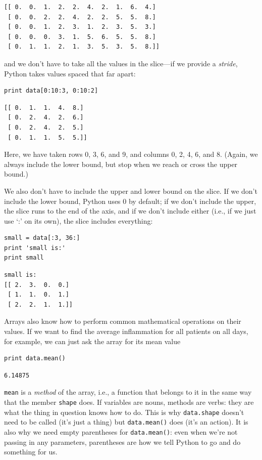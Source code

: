 \documentclass[]{book}
\newcommand{\gdef}[2]{\emph{#2}}
\begin{document}
\begin{verbatim}
[[ 0.  0.  1.  2.  2.  4.  2.  1.  6.  4.]
 [ 0.  0.  2.  2.  4.  2.  2.  5.  5.  8.]
 [ 0.  0.  1.  2.  3.  1.  2.  3.  5.  3.]
 [ 0.  0.  0.  3.  1.  5.  6.  5.  5.  8.]
 [ 0.  1.  1.  2.  1.  3.  5.  3.  5.  8.]]
\end{verbatim}

and we don't have to take all the values in the slice---if we provide a
\gdef{g:stride}{stride}, Python takes values spaced that far apart:

\begin{verbatim}
print data[0:10:3, 0:10:2]
\end{verbatim}

\begin{verbatim}
[[ 0.  1.  1.  4.  8.]
 [ 0.  2.  4.  2.  6.]
 [ 0.  2.  4.  2.  5.]
 [ 0.  1.  1.  5.  5.]]
\end{verbatim}

Here, we have taken rows 0, 3, 6, and 9, and columns 0, 2, 4, 6, and 8.
(Again, we always include the lower bound, but stop when we reach or
cross the upper bound.)

We also don't have to include the upper and lower bound on the slice. If
we don't include the lower bound, Python uses 0 by default; if we don't
include the upper, the slice runs to the end of the axis, and if we
don't include either (i.e., if we just use `:' on its own), the slice
includes everything:

\begin{verbatim}
small = data[:3, 36:]
print 'small is:'
print small
\end{verbatim}

\begin{verbatim}
small is:
[[ 2.  3.  0.  0.]
 [ 1.  1.  0.  1.]
 [ 2.  2.  1.  1.]]
\end{verbatim}

Arrays also know how to perform common mathematical operations on their
values. If we want to find the average inflammation for all patients on
all days, for example, we can just ask the array for its mean value

\begin{verbatim}
print data.mean()
\end{verbatim}

\begin{verbatim}
6.14875
\end{verbatim}

\texttt{mean} is a \gdef{g:method}{method} of the array, i.e., a
function that belongs to it in the same way that the member
\texttt{shape} does. If variables are nouns, methods are verbs: they are
what the thing in question knows how to do. This is why
\texttt{data.shape} doesn't need to be called (it's just a thing) but
\texttt{data.mean()} does (it's an action). It is also why we need empty
parentheses for \texttt{data.mean()}: even when we're not passing in any
parameters, parentheses are how we tell Python to go and do something
for us.
\end{document}
